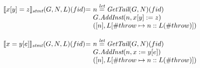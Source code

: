 \[\begin{array}{l@{}l@{~}l}
\transfun{\irstore{x}{y}{z}}_{\emph{stmt}}(G,N,L)(fid) & = &
	n \letval \GetTail(G,N)(fid)\\
	& & G.\emph{AddInst}(n,x[y] := z)\\
	& & ([n],L[\#throw \mapsto n::L(\#throw)])\\
	& & \\

\transfun{\irload{x}{y}{e}}_{\emph{stmt}}(G,N,L)(fid) & = &
	n \letval \GetTail(G,N)(fid)\\
	& & G.\emph{AddInst}(n,x := y[e])\\
	& & ([n],L[\#throw \mapsto n::L(\#throw)])\\
	& & \\
	
\end{array}
\]


